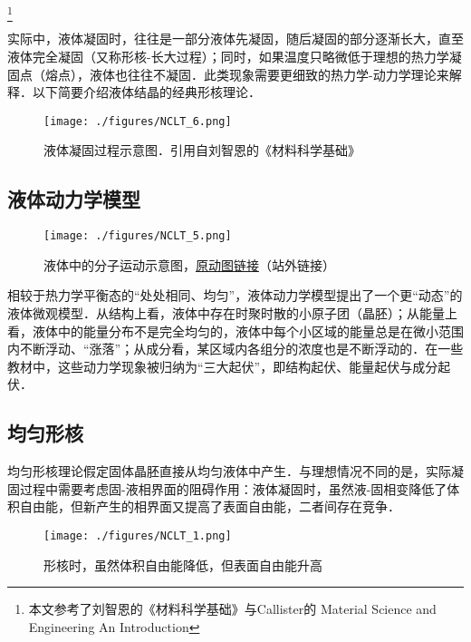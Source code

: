 \footnote{本文参考了刘智恩的《材料科学基础》与Callister的 Material Science and Engineering An Introduction}

\begin{issues}
\issueDraft
{}
\end{issues}

实际中，液体凝固时，往往是一部分液体先凝固，随后凝固的部分逐渐长大，直至液体完全凝固（又称形核-长大过程）；同时，如果温度只略微低于理想的热力学凝固点（熔点），液体也往往不凝固．此类现象需要更细致的热力学-动力学理论来解释．以下简要介绍液体结晶的经典形核理论．

\begin{figure}[ht]
\centering
\texttt{[image: ./figures/NCLT\_6.png]}
\caption{液体凝固过程示意图．引用自刘智恩的《材料科学基础》} \label{NCLT_fig6}
\end{figure}

\subsection{液体动力学模型}
\begin{figure}[ht]
\centering
\texttt{[image: ./figures/NCLT\_5.png]}
\caption{液体中的分子运动示意图，\href{https://chem.libretexts.org/Bookshelves/General_Chemistry/Map\%3A_A_Molecular_Approach_(Tro)/11\%3A_Liquids_Solids_and_Intermolecular_Forces/11.02\%3A_Solids_Liquids_and_Gases-_A_Molecular_Comparison}{原动图链接}（站外链接）} \label{NCLT_fig5}
\end{figure}

相较于热力学平衡态的“处处相同、均匀”，液体动力学模型提出了一个更“动态”的液体微观模型．从结构上看，液体中存在时聚时散的小原子团（晶胚）；从能量上看，液体中的能量分布不是完全均匀的，液体中每个小区域的能量总是在微小范围内不断浮动、“涨落”；从成分看，某区域内各组分的浓度也是不断浮动的．在一些教材中，这些动力学现象被归纳为“三大起伏”，即结构起伏、能量起伏与成分起伏．

\subsection{均匀形核}
均匀形核理论假定固体晶胚直接从均匀液体中产生．与理想情况不同的是，实际凝固过程中需要考虑固-液相界面的阻碍作用：液体凝固时，虽然液-固相变降低了体积自由能，但新产生的相界面又提高了表面自由能，二者间存在竞争．
\begin{figure}[ht]
\centering
\texttt{[image: ./figures/NCLT\_1.png]}
\caption{形核时，虽然体积自由能降低，但表面自由能升高} \label{NCLT_fig1}
\end{figure}

